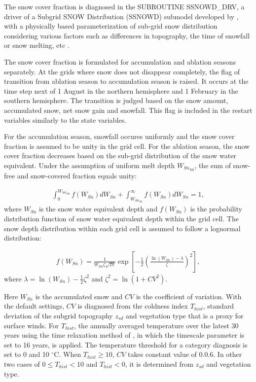 The snow cover fraction is diagnosed in the SUBROUTINE SSNOWD\_DRV, a driver of a Subgrid SNOW Distribution (SSNOWD) submodel developed by \citet{Liston2004-kr}, with a physically based
parameterization of sub-grid snow distribution considering various factors such as differences in topography, the time of snowfall or snow melting, etc \citep{Nitta2014-ct, Tatebe2019-ow}.

The snow cover fraction is formulated for accumulation and ablation seasons separately. At the grids where snow does not disappear completely, the flag of transition from ablation season to
accumulation season is raised. It occurs at the time step next of 1 August in the northern hemisphere and 1 February in the southern hemisphere. The transition is judged based on the snow amount,
accumulated snow, net snow gain and snowfall. This flag is included in the restart variables similarly to the state variables.

For the accumulation season, snowfall occures uniformly and the snow cover fraction is assumed to be unity in the grid cell. For the ablation season, the snow cover fraction decreases based on the
sub-grid distribution of the snow water equivalent. Under the assumption of uniform melt depth \({W_{Sn}}_m\), the sum of snow-free and snow-covered fraction equals unity:

\begin{eqnarray}
\int_0^{{W_{Sn}}_m} f(W_{Sn})dW_{Sn} + \int_{{W_{Sn}}_m}^\infty f(W_{Sn})dW_{Sn} = 1, \label{8-1}
\end{eqnarray} where \(W_{Sn}\) is the snow water equivalent depth and \(f(W_{Sn})\) is the probability distribution function of snow water equivalent depth within the grid cell. The snow depth distribution
within each grid cell is assumed to follow a lognormal distribution:

\begin{eqnarray}
f(W_{Sn}) = \frac{1}{W_{Sn}\zeta\sqrt{2\pi}} \exp{ \left[
 -\frac{1}{2} {\left( \frac{\ln(W_{Sn})-\lambda}{\zeta} \right)}^2
\right] }, \label{8-2}
\end{eqnarray} where \(\lambda = \ln(W_{Sn}) - \frac{1}{2}\zeta^2\) and \(\zeta^2 = \ln(1+CV^2)\).

Here \(W_{Sn}\) is the accumulated snow and \(CV\) is the coefficient of variation. With the default settings, \(CV\) is diagnosed from the coldness index \(T_{hist}\), standard deviation of the
subgrid topography \(z_{sd}\) and vegetation type that is a proxy for surface winds. For \(T_{hist}\), the annually averaged temperature over the latest 30 years using the time relaxation method of
\citet{Krinner2005-xa}, in which the timescale parameter is set to 16 years, is applied. The temperature threshold for a category diagnosis is set to 0 and 10 \(^\circ\mathrm{C}\). When
\(T_{hist} \ge 10\), \(CV\) takes constant value of 0.0.6. In other two cases of \(0 \le T_{hist} < 10\) and \(T_{hist} < 0\), it is determined from \(z_{sd}\) and vegetation type.


